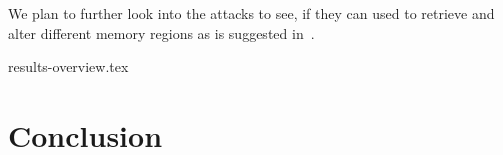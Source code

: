 \documentclass{../llncs/llncs}
\begin{document}
        We plan to further look into the attacks to see, if they can used to retrieve and alter different memory regions as is suggested in~\cite{se:oracle:part1}.

\setlength{\tabcolsep}{2pt}
\renewcommand{\arraystretch}{1.2}

    {results-overview.tex}

\setlength{\tabcolsep}{\oldtabcolsep}
\renewcommand{\arraystretch}{1.2}
\setlength{\floatsep}{\oldtabcolsep}


\section{Conclusion}


\end{document}
